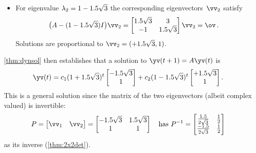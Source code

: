 \begin{example}
\begin{solution}
\begin{itemize}
\item For eigenvalue \(\lambda_2=1-1.5\sqrt3\) the corresponding eigenvectors~\(\vv_2\) satisfy
\begin{equation*}
\big(A-(1-\i\sqrt3)I\big)\vv_2=\begin{bmatrix} \i\sqrt3&3\\-1&\i\sqrt3 \end{bmatrix}\vv_2=\ov\,.
\end{equation*}
Solutions are proportional to \(\vv_2=(+\i\sqrt3,1)\).
\end{itemize}
\autoref{thm:dynsol} then establishes that a solution to \(\yv(t+1)=A\yv(t)\) is
\begin{equation*}
\yv(t)=c_1(1+\i\sqrt3)^t\begin{bmatrix} -\i\sqrt3\\1 \end{bmatrix}
+c_2(1-\i\sqrt3)^t\begin{bmatrix} +\i\sqrt3\\1 \end{bmatrix}.
\end{equation*}
This is a general solution since the matrix of the two eigenvectors (albeit complex valued) is invertible:
\begin{equation*}
P=\begin{bmatrix} \vv_1&\vv_2 \end{bmatrix}
=\begin{bmatrix} -\i\sqrt3&\i\sqrt3\\1&1 \end{bmatrix}
\quad\text{has }
P^{-1}=\begin{bmatrix} \frac \i{2\sqrt3}&\frac12\\\frac{-\i}{2\sqrt3}&\frac12 \end{bmatrix}
\end{equation*}
as its inverse (\autoref{thm:2x2det}).


\end{solution}
\end{example}
